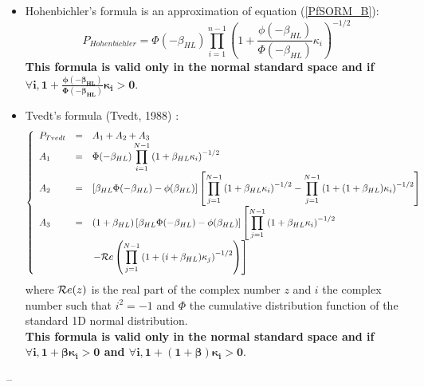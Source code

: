 {  \begin{itemize}
  \item Hohenbichler's formula is an approximation of equation (\ref{PfSORM_B}):
    \begin{equation}
      \label{PfSORM_HB}
      \displaystyle P_{Hohenbichler} = \Phi(-\beta_{HL}) \prod_{i=1}^{n-1} \left( 1+\frac{\phi(-\beta_{HL})}{\Phi(-\beta_{HL})}\kappa_i  \right)  ^{-1/2}
    \end{equation}
        {\bf This formula is valid only in the normal standard space  and if $\boldsymbol{\forall i, 1+\frac{\phi(-\beta_{HL})}{\Phi(-\beta_{HL})}\kappa_i > 0}$}.
      \item Tvedt's formula (Tvedt, 1988) :
        \begin{equation}
          \label{PfSORM_T}
          \left\{
          \begin{array}{lcl}
            \displaystyle P_{Tvedt} & = & A_1 + A_2 + A_3 \\
            \displaystyle A_1 & = &  \displaystyle \Phi(-\beta_{HL}) \prod_{i=1}^{N-1} \left( 1+\beta_{HL} \kappa_i \right) ^{-1/2}\\
            \displaystyle A_2 & = &   \displaystyle\left[ \beta_{HL}  \Phi(-\beta_{HL}) -  \phi(\beta_{HL})\right ]  \left[  \prod_{j=1}^{N-1}  \left( 1+\beta_{HL} \kappa_i \right) ^{-1/2} -    \prod_{j=1}^{N-1}  \left( 1+(1 + \beta_{HL}) \kappa_i \right) ^{-1/2} \right ] \\
            \displaystyle A_3 & = &  \displaystyle(1 + \beta_{HL}) \left[ \beta_{HL}  \Phi(-\beta_{HL}) -  \phi(\beta_{HL})\right ]  \left[  \prod_{j=1}^{N-1}  \left( 1+\beta_{HL} \kappa_i \right) ^{-1/2} \right.\\
              & & \displaystyle\left. - {{\mathcal R}}e \left(   \prod_{j=1}^{N-1}  \left( 1+(i + \beta_{HL}) \kappa_j \right) ^{-1/2}  \right)\right ]
          \end{array}
          \right.
        \end{equation}
        where $ {{\mathcal R}}e(z)$ is the real part of the complex number $z$ and $i$ the complex number such that $i^2 = -1$ and $\Phi$ the cumulative distribution function of the standard 1D normal distribution.\\
        {\bf This formula is valid only in the normal standard space  and if $\boldsymbol{\forall i, 1+\beta \kappa_i > 0}$ and $\boldsymbol{\forall i, 1+(1 + \beta) \kappa_i> 0}$}.
  \end{itemize}

}
{
  --}


